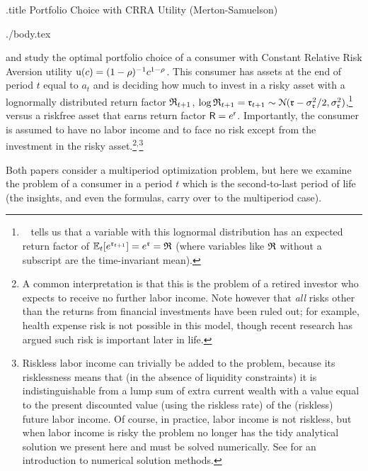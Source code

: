 \documentclass{bejournal}
\begin{document}


\begin{verbatimwrite}{\jobname.title}
Portfolio Choice with CRRA Utility (Merton-Samuelson)
\end{verbatimwrite}
\medskip\medskip\medskip



\begin{verbatimwrite}{./body.tex}

  \cite{merton:restat} and \cite{samuelson:portfolio} study the
  optimal portfolio choice of a consumer with Constant Relative Risk
  Aversion utility ${\mathrm{u}}(c) = (1-\rho)^{-1}c^{1-\rho}$.  This
  consumer has assets at the end of period $t$ equal to $a_{t}$ and is
  deciding how much to invest in a risky asset with a lognormally
  distributed return factor $\mathfrak{R}_{t+1}$, $\log \mathfrak{R}_{t+1} =
  \mathfrak{r}_{t+1} \sim
  \mathcal{N}(\mathfrak{r}-\sigma_{\mathfrak{r}}^{2}/2,\sigma^{2}_{\mathfrak{r}})$,\footnote{\MathFacts~
    tells us that a variable with this lognormal distribution has an
    expected return factor of
    $\mathbb{E}_{t}[e^{\mathfrak{r}_{t+1}}]=e^{\mathfrak{r}}=\mathfrak{R}$ (where variables
    like $\mathfrak{R}$ without a subscript are the time-invariant mean).}
  versus a riskfree asset that earns return factor
  $\mathsf{R}=e^{\mathsf{r}}$.  Importantly, the consumer is assumed to have
  no labor income and to face no risk except from the investment in
  the risky asset.\footnote{A common interpretation is that this is
    the problem of a retired investor who expects to receive no
    further labor income.  Note however that {\it all} risks other
    than the returns from financial investments have been ruled out;
    for example, health expense risk is not possible in this model,
    though recent research has argued such risk is important later in
    life.}$^{,}$\footnote{Riskless labor income can trivially be added
    to the problem, because its risklessness means that (in the
    absence of liquidity constraints) it is indistinguishable from a
    lump sum of extra current wealth with a value equal to the present
    discounted value (using the riskless rate) of the (riskless)
    future labor income.  Of course, in practice, labor income is not
    riskless, but when labor income is risky the problem no longer has
    the tidy analytical solution we present here and must be solved
    numerically.  See \cite{SolvingMicroDSOPs} for an introduction to
    numerical solution methods.}

Both papers consider a multiperiod optimization problem, but here we
examine the problem of a consumer in a period $t$ which is the
second-to-last period of life (the insights, and even the formulas,
carry over to the multiperiod case).


\end{verbatimwrite}
\end{document}
